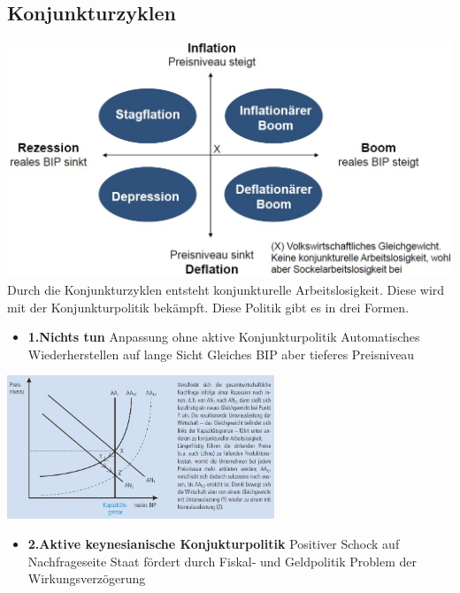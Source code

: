 \subsection{Konjunkturzyklen}
\includegraphics[width=0.9\linewidth]{images/konjukturzyklen.jpg}\\
Durch die Konjunkturzyklen entsteht konjunkturelle Arbeitslosigkeit. Diese wird mit der Konjunkturpolitik bekämpft. Diese Politik gibt es in drei Formen.\\
\begin{minipage}{11cm}
	\begin{itemize}
		\item \textbf{1.Nichts tun} 
		\subitem Anpassung ohne aktive Konjunkturpolitik
		\subitem Automatisches Wiederherstellen auf lange Sicht
		\subitem Gleiches BIP aber tieferes Preisniveau		
	\end{itemize}
\end{minipage}
\begin{minipage}{8cm}
	\includegraphics[width=8cm]{images/nichts.jpg}
\end{minipage}
\begin{minipage}{11cm}
	\begin{itemize}
		\item \textbf{2.Aktive keynesianische Konjukturpolitik}
		\subitem Positiver Schock auf Nachfrageseite
		\subitem Staat fördert durch Fiskal- und Geldpolitik
		\subitem Problem der Wirkungsverzögerung
	\end{itemize}
\end{minipage}
